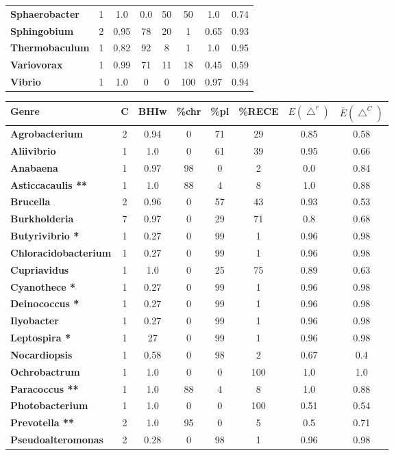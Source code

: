 \begin{landscape}
\begin{small}
\begin{table}[h]
\begin{minipage}[t]{0.45\linewidth}
\begin{tabular}{>{\bfseries}l|c|c|ccc|c|c}
Sphaerobacter&1&1.0&0.0&50&50&1.0&0.74\\
Sphingobium&2&0.95&78&20&1&0.65&0.93\\
Thermobaculum&1&0.82&92&8&1&1.0&0.95\\
Variovorax&1&0.99&71&11&18&0.45&0.59\\
Vibrio&1&1.0&0&0&100&0.97&0.94\\
	  \end{tabular}
	  \label{subtabinfores}
	  \end{minipage}
	  \hspace{3.5cm}
	  \begin{minipage}[t]{0.45\linewidth}
	  \begin{tabular}{>{\bfseries}l|c|c|ccc|c|c}
	  \textbf{Genre}&\textbf{C}&\textbf{\footnotesize BHIw}& \textbf{\footnotesize\%chr}&\textbf{\footnotesize\%pl}&\textbf{\scriptsize\%RECE}&$E(\bigtriangleup^{r}) $&$\bar{E}(\bigtriangleup^{C}) $\\
	\hline
	Agrobacterium&2&0.94&0&71&29&0.85&0.58\\
Aliivibrio&1&1.0&0&61&39&0.95&0.66\\
\rowcolor{Cchr}Anabaena&1&0.97&98&0&2&0.0&0.84\\
\rowcolor{Cchr}Asticcacaulis **&1&1.0&88&4&8&1.0&0.88\\
Brucella &2&0.96&0&57&43&0.93&0.53\\
Burkholderia&7&0.97&0&29&71&0.8&0.68\\
\rowcolor{Cpl}Butyrivibrio *&1&0.27&0&99&1&0.96&0.98\\
Chloracidobacterium&1&0.27&0&99&1&0.96&0.98\\
Cupriavidus&1&1.0&0&25&75&0.89&0.63\\
\rowcolor{Cpl}Cyanothece *&1&0.27&0&99&1&0.96&0.98\\
\rowcolor{Cpl}Deinococcus *&1&0.27&0&99&1&0.96&0.98\\
Ilyobacter&1&0.27&0&99&1&0.96&0.98\\
\rowcolor{Cpl}Leptospira *&1&27&0&99&1&0.96&0.98\\
Nocardiopsis&1&0.58&0&98&2&0.67&0.4\\
Ochrobactrum&1&1.0&0&0&100&1.0&1.0\\
\rowcolor{Cchr}Paracoccus **&1&1.0&88&4&8&1.0&0.88\\
Photobacterium&1&1.0&0&0&100&0.51&0.54\\
\rowcolor{Cchr}Prevotella **&2&1.0&95&0&5&0.5&0.71\\
Pseudoalteromonas&2&0.28&0&98&1&0.96&0.98\\

\end{tabular}
\end{minipage}
\end{table}
\end{small}
\end{landscape}
